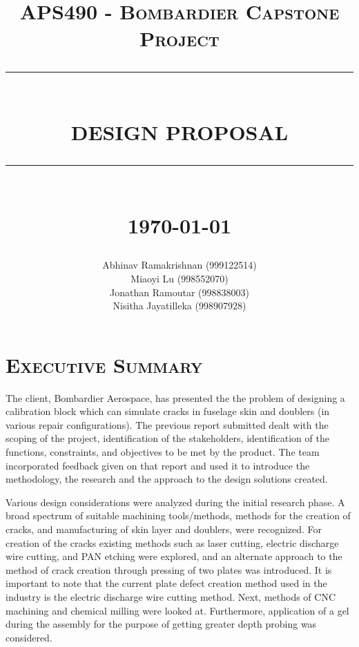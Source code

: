 \documentclass[12pt]{article}
\newcommand{\HRule}[1]{\rule{\linewidth}{#1}}
\begin{document}
\title{ \normalsize \textsc{APS490 - Bombardier Capstone Project}
		\\ [2.0cm]
		\HRule{0.5pt} \\
		\LARGE \textbf{\uppercase{Design Proposal}}
		\HRule{2pt} \\ [0.5cm]
		\normalsize \today \vspace*{5\baselineskip}}

\date{}

\author{
		Abhinav Ramakrishnan (999122514) \\ 
		Miaoyi Lu (998552070) \\ 
		Jonathan Ramoutar (998838003) \\ 
		Nisitha Jayatilleka (998907928) }

\maketitle
\newpage
\section*{\textsc{Executive Summary}}

The client, Bombardier Aerospace, has presented the the problem of designing a calibration block which can simulate cracks in fuselage skin and doublers (in various repair configurations). The previous report submitted dealt with the scoping of the project, identification of the stakeholders, identification of the functions, constraints, and objectives to be met by the product. The team incorporated feedback given on that report and used it to introduce the methodology, the research and the approach to the design solutions created.

Various design considerations were analyzed during the initial research phase. A broad spectrum of suitable machining tools/methods, methods for the creation of cracks, and manufacturing of skin layer and doublers, were recognized. For creation of the cracks existing methods such as laser cutting, electric discharge wire cutting, and PAN etching were explored, and an alternate approach to the method of crack creation through pressing of two plates was introduced. It is important to note that the current plate defect creation method used in the industry is the electric discharge wire cutting method. Next, methods of CNC machining and chemical milling were looked at. Furthermore, application of a gel during the assembly for the purpose of getting greater depth probing was considered.
\end{document}
